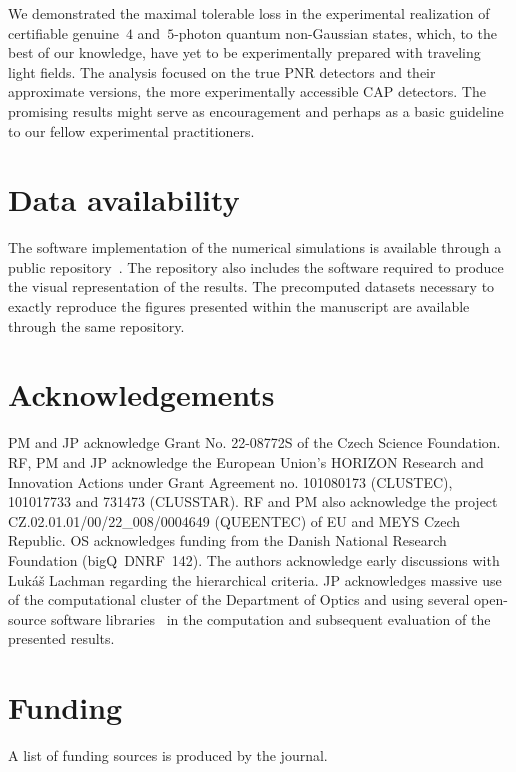 \documentclass{article}
\begin{document}
We demonstrated the maximal tolerable loss in the experimental realization of certifiable genuine~$4$ and~$5$-photon quantum non-Gaussian states, which, to the best of our knowledge, have yet to be experimentally prepared with traveling light fields. The analysis focused on the true PNR detectors and their approximate versions, the more experimentally accessible CAP detectors. The promising results might serve as encouragement and perhaps as a basic guideline to our fellow experimental practitioners.

%

\FloatBarrier
\section*{Data availability}

The software implementation of the numerical simulations is available through a public repository~\cite{source}. The repository also includes the software required to produce the visual representation of the results. The precomputed datasets necessary to exactly reproduce the figures presented within the manuscript are available through the same repository.

\FloatBarrier
\section*{Acknowledgements}

PM and JP acknowledge Grant No. 22-08772S of the Czech Science Foundation.
RF, PM and JP acknowledge the European Union's HORIZON Research and Innovation Actions under Grant Agreement no. 101080173 (CLUSTEC), 101017733 and 731473 (CLUSSTAR). RF and PM also acknowledge the project CZ.02.01.01/00/22\_008/0004649 (QUEENTEC) of EU and MEYS Czech Republic. OS acknowledges funding from the Danish National Research Foundation (bigQ~DNRF~142).
%
The authors acknowledge early discussions with Luk\'{a}\v{s} Lachman regarding the hierarchical criteria. JP acknowledges massive use of the computational cluster of the Department of Optics and using several open-source software libraries~\cite{hunter2007,harris2020,virtanen2020,dalcin2021} in the computation and subsequent evaluation of the presented results.

\FloatBarrier
\section*{Funding}

A list of funding sources is produced by the journal.

%

\FloatBarrier
\printbibliography
\end{document}
